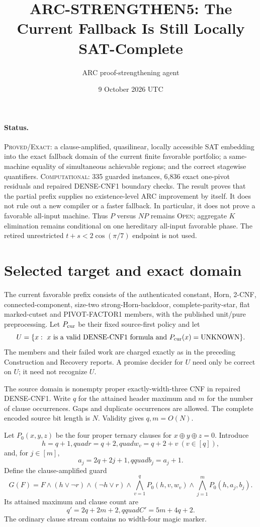 \documentclass[11pt]{article}
\title{ARC-STRENGTHEN5: The Current Fallback Is Still Locally SAT-Complete}
\author{ARC proof-strengthening agent}
\date{9 October 2026 UTC}
\begin{document}
\sloppy\maketitle

\paragraph{Status.}
\textsc{Proved/Exact}: a clause-amplified, quasilinear, locally accessible
SAT embedding into the exact fallback domain of the current finite favorable
portfolio; a same-machine equality of simultaneous achievable regions; and
the correct stagewise quantifiers.  \textsc{Computational}: 335 guarded
instances, 6,836 exact one-pivot residuals and repaired DENSE-CNF1 boundary
checks.  The result proves that the partial prefix supplies no existence-level
ARC improvement by itself.  It does not rule out a new compiler or a faster
fallback.  In particular, it does not prove a favorable all-input machine.
Thus $P$ versus $NP$ remains \textsc{Open}; aggregate $K$ elimination remains
conditional on one hereditary all-input favorable phase.  The retired
unrestricted $t+s<2\cos(\pi/7)$ endpoint is not used.

\section{Selected target and exact domain}

The current favorable prefix consists of the authenticated constant,
Horn, 2-CNF, connected-component, size-two strong-Horn-backdoor,
complete-parity-star, flat marked-cutset and \textsc{PIVOT-FACTOR1} members,
with the published unit/pure preprocessing.  Let $P_{\rm cur}$ be their fixed
source-first policy and let
\[
 U=\{x:\ x\hbox{ is a valid DENSE-CNF1 formula and }
               P_{\rm cur}(x)=\mathrm{UNKNOWN}\}.
\]
The members and their failed work are charged exactly as in the preceding
Construction and Recovery reports.  A promise decider for $U$ need only be
correct on $U$; it need not recognize $U$.

The source domain is nonempty proper exactly-width-three CNF in repaired
DENSE-CNF1.  Write $q$ for the attained header maximum and $m$ for the number
of clause occurrences.  Gaps and duplicate occurrences are allowed.  The
complete encoded source bit length is $N$.  Validity gives $q,m=O(N)$.

Let $P_0(x,y,z)$ be the four proper ternary clauses for
$x\oplus y\oplus z=0$.  Introduce
\[
 h=q+1,quad r=q+2,quad w_v=q+2+v\ (v\in[q]),
\]
and, for $j\in[m]$,
\[
 a_j=2q+2j+1,qquad b_j=a_j+1.
\]
Define the clause-amplified guard
\begin{equation}
 G(F)=F\wedge(h\vee\neg r)\wedge(\neg h\vee r)
 \wedge\bigwedge_{v=1}^{q}P_0(h,v,w_v)
 \wedge\bigwedge_{j=1}^{m}P_0(h,a_j,b_j).                 \tag{1}
\end{equation}
Its attained maximum and clause count are
\[
 q'=2q+2m+2,qquad C'=5m+4q+2.                            \tag{2}
\]
The ordinary clause stream contains no width-four magic marker.
\end{document}
